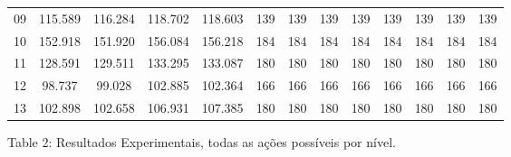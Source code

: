 \documentclass[12pt,a4paper]{article}
\begin{document}
\begin{adjustbox}{width={\textwidth}, totalheight={\textheight}, keepaspectratio}
\begin{tabular}{l cccc cccc cccc}
    09    & 115.589                                    & 116.284                         & 118.702                            & 118.603    & 139 & 139  & 139 & 139        & 139 & 139  & 139 & 139        \\
    10    & 152.918                                    & 151.920                         & 156.084                            & 156.218    & 184 & 184  & 184 & 184        & 184 & 184  & 184 & 184        \\
    11    & 128.591                                    & 129.511                         & 133.295                            & 133.087    & 180 & 180  & 180 & 180        & 180 & 180  & 180 & 180        \\
    12    & 98.737                                     & 99.028                          & 102.885                            & 102.364    & 166 & 166  & 166 & 166        & 166 & 166  & 166 & 166        \\
    13    & 102.898                                    & 102.658                         & 106.931                            & 107.385    & 180 & 180  & 180 & 180        & 180 & 180  & 180 & 180        \\
    \bottomrule
  \end{tabular}
\end{adjustbox}

\vspace*{0.2cm}

\begin{center}
  Table 2: Resultados Experimentais, todas as ações possíveis por nível.
\end{center}

\vspace*{0.5cm}
\end{document}
